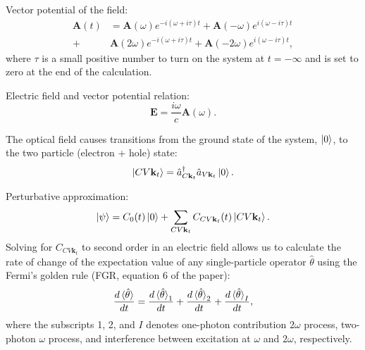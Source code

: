\documentclass{article}
\newcommand{\kt}{\mathbf{k}_{t}}
\newcommand{\Op}{\hat{\mathcal{\theta}}}
\begin{document}
Vector potential of the field:
\begin{align*}\label{eq:vector_potential}
\mathbf{A}(t)   &=\mathbf{A}(  \omega)e^{-i(\omega+i\tau)t} 
                + \mathbf{A}(- \omega)e^{ i(\omega-i\tau)t} \\
                +&\mathbf{A}( 2\omega)e^{-i(\omega+i\tau)t} 
                + \mathbf{A}(-2\omega)e^{ i(\omega-i\tau)t},
\end{align*}
where $\tau$ is a small positive number to turn on the system at $t=-\infty$ and
is set to zero at the end of the calculation.

Electric field and vector potential relation:
\begin{equation*}\label{eq:electricF-vPotential_rel}
\mathbf{E} = \frac{i\omega}{c}\mathbf{A}(\omega).  
\end{equation*}

The optical field causes transitions from the ground state of the system,
$\ket{0}$, to the two particle (electron + hole) state:
\begin{equation*}\label{eq:transition}
\ket{CV\kt} = \hat{a}^{\dag}_{C\kt} \hat{a}_{V\kt} \ket{0}.
\end{equation*}

Perturbative approximation:
\begin{equation*}\label{eq:perturbative_approx}
\ket{\psi} = C_{0}(t) \ket{0} + \sum_{CV\kt} C_{CV\kt}(t)\ket{CV\kt}.
\end{equation*}
Solving for $C_{CV\kt}$ to second order in an electric field allows us to
calculate the rate of change of the expectation value of any single-particle
operator $\Op$ using the Fermi's golden rule (FGR, equation 6 of
the paper):
\begin{equation}\label{eq:FGR_1-2-I_contribution}
\frac{d \expval*{\Op}    }{dt} =
\frac{d \expval*{\Op}_{1}}{dt} +
\frac{d \expval*{\Op}_{2}}{dt} +
\frac{d \expval*{\Op}_{I}}{dt} ,
\end{equation}
where the subscripts 1, 2, and $I$ denotes one-photon contribution $2\omega$
process, two-photon $\omega$ process, and interference between excitation at 
$\omega$ and $2\omega$, respectively.
\end{document}
